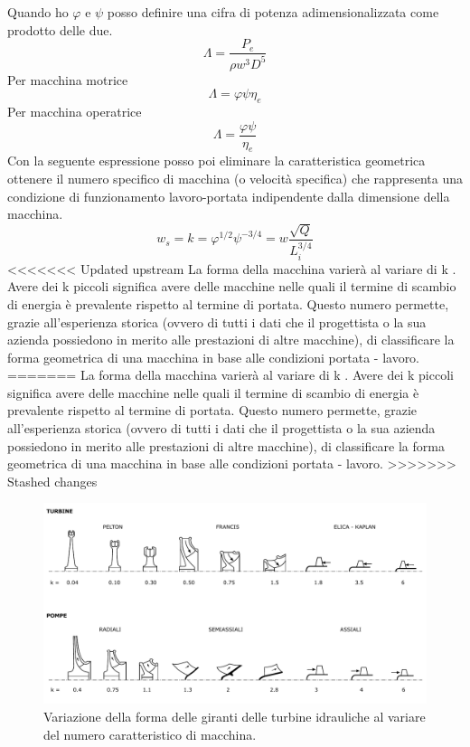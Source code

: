 Quando ho $\varphi$ e $\psi$ posso definire una cifra di potenza adimensionalizzata come prodotto delle due.
\begin{equation}
\Lambda = \frac{P_e}{\rho w^3 D^5}
\end{equation}
Per macchina motrice
\begin{equation}
\Lambda = \varphi \psi \eta_e
\end{equation}
Per macchina operatrice
\begin{equation}
\Lambda = \frac{\varphi \psi}{\eta_e}
\end{equation}
Con la seguente espressione posso poi eliminare la caratteristica geometrica ottenere il numero specifico di macchina (o velocità specifica) che rappresenta una condizione di funzionamento lavoro-portata indipendente dalla dimensione della macchina. 
\begin{equation}
w_s = k = \varphi^{1/2} \psi^{-3/4} = w \frac{\sqrt{Q}}{L_i^{3/4}}
\end{equation}
<<<<<<< Updated upstream
La forma della macchina varierà al variare di k . Avere dei k piccoli significa avere delle macchine nelle quali il termine di scambio di energia è prevalente rispetto al termine di portata. Questo numero permette, grazie all'esperienza storica (ovvero di tutti i dati che il progettista o la sua azienda possiedono in merito alle prestazioni di altre macchine), di classificare la forma geometrica di una macchina in base alle condizioni portata - lavoro.
=======
La forma della macchina varierà al variare di k . Avere dei k piccoli significa avere delle macchine nelle quali il termine di scambio di energia è prevalente rispetto al termine di portata. Questo numero permette, grazie all’esperienza storica (ovvero di tutti i dati che il progettista o la sua azienda possiedono in merito alle prestazioni di altre macchine), di classificare la forma geometrica di una macchina in base alle condizioni portata - lavoro.
>>>>>>> Stashed changes
\begin{figure}[h!]
\centering
  \includegraphics[width=\textwidth]{fig/numcar.pdf}
\caption{Variazione della forma delle giranti delle turbine idrauliche al variare del numero caratteristico di macchina.}
\label{fig:numcar}
\end{figure}
